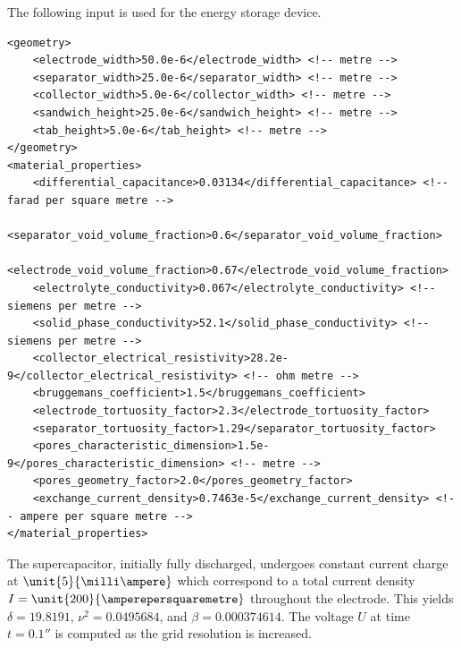 The following input is used for the energy storage device.
{\tiny
\begin{lstlisting}
<geometry>
    <electrode_width>50.0e-6</electrode_width> <!-- metre -->
    <separator_width>25.0e-6</separator_width> <!-- metre -->
    <collector_width>5.0e-6</collector_width> <!-- metre -->
    <sandwich_height>25.0e-6</sandwich_height> <!-- metre -->
    <tab_height>5.0e-6</tab_height> <!-- metre -->
</geometry>
<material_properties>
    <differential_capacitance>0.03134</differential_capacitance> <!-- farad per square metre -->
    <separator_void_volume_fraction>0.6</separator_void_volume_fraction>
    <electrode_void_volume_fraction>0.67</electrode_void_volume_fraction>
    <electrolyte_conductivity>0.067</electrolyte_conductivity> <!-- siemens per metre -->
    <solid_phase_conductivity>52.1</solid_phase_conductivity> <!-- siemens per metre -->
    <collector_electrical_resistivity>28.2e-9</collector_electrical_resistivity> <!-- ohm metre -->
    <bruggemans_coefficient>1.5</bruggemans_coefficient>
    <electrode_tortuosity_factor>2.3</electrode_tortuosity_factor>
    <separator_tortuosity_factor>1.29</separator_tortuosity_factor>
    <pores_characteristic_dimension>1.5e-9</pores_characteristic_dimension> <!-- metre -->
    <pores_geometry_factor>2.0</pores_geometry_factor>
    <exchange_current_density>0.7463e-5</exchange_current_density> <!-- ampere per square metre -->
</material_properties>
\end{lstlisting}
}
The supercapacitor, initially fully discharged, undergoes constant current
charge at $\unit{5}{\milli\ampere}$ which correspond to a total current
density $I=\unit{200}{\amperepersquaremetre}$ throughout the electrode.
This yields
$\delta = 19.8191$,
$\nu^2 = 0.0495684$, and
$\beta = 0.000374614$.
The voltage $U$ at time $t=\unit{0.1}{\second}$ is computed as the grid
resolution is increased.

